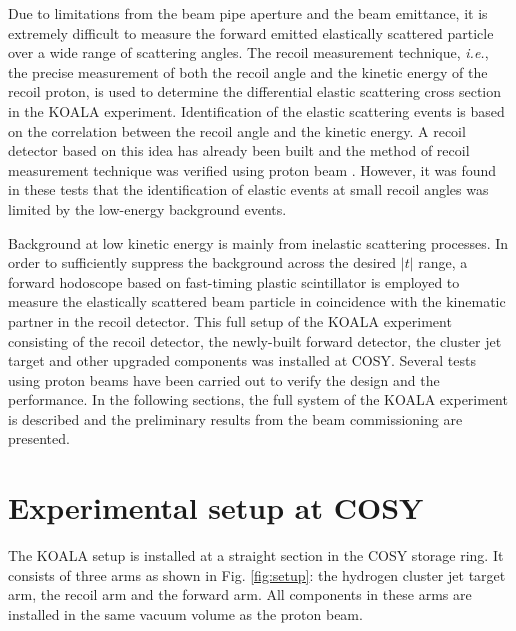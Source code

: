 \documentclass[number,5p]{elsarticle}
\begin{document}
Due to limitations from the beam pipe aperture and the beam emittance,
it is extremely difficult to measure the forward emitted elastically scattered particle over a wide range of scattering angles.
The recoil measurement technique, \textit{i.e.}, the precise measurement of both the recoil angle and the kinetic energy of the recoil proton, 
is used to determine the differential elastic scattering cross section in the
KOALA experiment.
Identification of the elastic scattering events is based on the correlation between the recoil angle and the kinetic energy.
A recoil detector based on this idea has already been built and the method of
recoil measurement technique was verified using proton beam
\cite{koala_article,recoil_article}.
However, it was found in these tests that the identification of elastic events at small recoil angles was limited by the low-energy background events.

Background at low kinetic energy is mainly from inelastic scattering processes.
In order to sufficiently suppress the background across the desired $|t|$ range,
a forward hodoscope based on fast-timing plastic scintillator is employed
to measure the elastically scattered beam particle in coincidence with the kinematic partner in the recoil detector.
This full setup of the KOALA experiment consisting of the recoil detector, the newly-built
forward detector, the cluster jet target and other upgraded components was installed at COSY.
Several tests using proton beams have been carried out to verify the design and the performance.
In the following sections,  the full system of the KOALA experiment is described and the preliminary results from the beam commissioning are presented.

\section{Experimental setup at COSY}
\label{sec:setup}

The KOALA setup is installed at a straight section in the COSY storage ring.
It consists of three arms as shown in Fig. \ref{fig:setup}: the hydrogen
cluster jet target arm, the recoil arm and the forward arm.
All components in these arms are installed in the same vacuum volume as the
proton beam.
\end{document}
